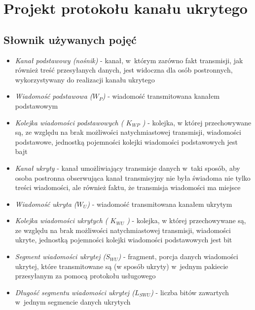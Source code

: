 \documentclass[a4paper, twoside, 12pt]{report}
\begin{document}
\chapter{Projekt protokołu kanału ukrytego}
    \section{Słownik używanych pojęć} \label{DICT}
    \begin{itemize}
        \item \emph{Kanał podstawowy (nośnik)} - kanał, w~którym zarówno fakt transmisji,
            jak również treść przesyłanych danych, jest widoczna dla osób postronnych,
            wykorzystywany do realizacji kanału ukrytego

        \item \emph{Wiadomość podstawowa (\(W_P\))} - wiadomość transmitowana kanałem
            podstawowym

        \item \emph{Kolejka wiadomości podstawowych ( \( K_{WP} \) )} - kolejka, w
                której przechowywane są, ze względu na brak możliwości natychmiastowej
                transmisji, wiadomości podstawowe, jednostką pojemności kolejki
                wiadomości podstawowych jest bajt

        \item \emph{Kanał ukryty} - kanał umożliwiający transmisje danych w~taki sposób,
            aby osoba postronna obserwująca kanał transmisyjny nie była świadoma
            nie tylko treści wiadomości, ale również faktu, że transmisja wiadomości ma miejsce

        \item \emph{Wiadomość ukryta (\(W_U\))} - wiadomość transmitowana kanałem ukrytym

        \item \emph{Kolejka wiadomości ukrytych ( \( K_{WU} \) )} - kolejka, w
                której przechowywane są, ze względu na brak możliwości natychmiastowej
                transmisji, wiadomości ukryte, jednostką pojemności kolejki
                wiadomości podstawowych jest bit

        \item \emph{Segment wiadomości ukrytej (\(S_{WU}\))} - fragment, porcja danych
            wiadomości ukrytej, które transmitowane są (w sposób ukryty) w~jednym
            pakiecie przesyłanym za pomocą protokołu usługowego

        \item \emph{Długość segmentu wiadomości ukrytej (\( L_{SWU} \))} - liczba
                bitów zawartych w~jednym segmencie danych ukrytych


\end{itemize}
\end{document}
